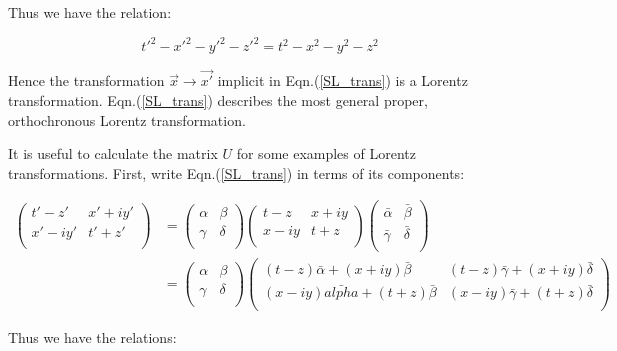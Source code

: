\noindent Thus we have the relation:

\begin{equation*}  
{t'}^2 - {x'}^2 - {y'}^2 - {z'}^2 = {t}^2 - {x}^2 - {y}^2 - {z}^2
\end{equation*}

\noindent Hence the transformation $\vec{x} \rightarrow \vec{x'}$ implicit in Eqn.(\ref{SL_trans}) is a Lorentz transformation. Eqn.(\ref{SL_trans}) describes the most general proper, orthochronous Lorentz transformation.

It is useful to calculate the matrix $U$ for some examples of Lorentz transformations. First, write Eqn.(\ref{SL_trans}) in terms of its components:

\begin{eqnarray*} 
\left(
\begin{array}{cc}
t' - z' & x' + i y' \\
x' - i y' & t' + z' \\
\end{array}
\right)
& =
\left(
\begin{array}{cc}
\alpha & \beta \\
\gamma & \delta \\
\end{array}
\right)
\left(
\begin{array}{cc}
t-z & x + i y \\
x - i y & t + z   \\
\end{array}
\right)
\left(
\begin{array}{cc}
\bar{\alpha} & \bar{\beta} \\
\bar{\gamma} & \bar{\delta} \\
\end{array}
\right) \\
& = \left(
\begin{array}{cc}
\alpha & \beta \\
\gamma & \delta \\
\end{array}
\right)
\left(
\begin{array}{cc}
(t-z)\bar{\alpha} + (x + iy)\bar{\beta} & (t-z)\bar{\gamma} + (x + iy)\bar{\delta} \\
(x - iy)\bar{alpha} + (t+z)\bar{\beta} & (x-iy)\bar{\gamma} + (t+z)\bar{\delta} \\
\end{array}
\right)
\end{eqnarray*}

\noindent Thus we have the relations:

